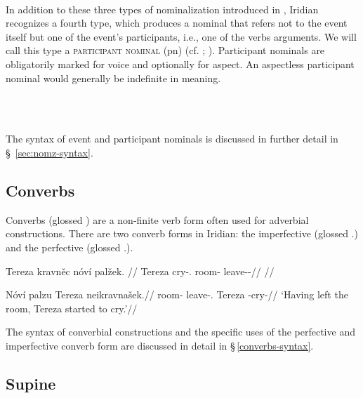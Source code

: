 \pex    {}\\
\xe

In addition to these three types of nominalization introduced in
\textcite{grimshaw1990}, Iridian recognizes a fourth type, which produces a
nominal that refers not to the event itself but one of the event's participants,
i.e., one of the verbs arguments. We will call this type a {\scshape participant
nominal} ({\sc pn}) (cf. \cite[400-5]{schackow2015}; \cite[297-8]{okuna}).
Participant nominals are obligatorily marked for voice and optionally for
aspect. An aspectless participant nominal would generally be indefinite in
meaning.

\pex	{}\\
		\\
\xe

The syntax of event and participant nominals is discussed in further detail in
\S~\ref{sec:nomz-syntax}.

\subsection{Converbs}\label{sec:converb}

Converbs (glossed \Cv{}) are a non-finite verb form often used for adverbial
constructions. There are two converb forms in Iridian: the imperfective
 (glossed \Cv{}.\Ipf{}) and the perfective
 (glossed \Cv{}.\Pf{}).

\pex
\begingl
\gla Tereza kravněc nóví palžek. //
\glb Tereza cry-\Cv{}.\Ipf{} room-\Gen{} leave-\Av{}-\Pf{}//
\glft {}//
\endgl
\xe

\pex
\begingl
\gla Nóví palzu Tereza neikravnašek.//
\glb room-\Gen{} leave-\Cv{}.\Pf{} Tereza -cry-//
\glft `Having left the room, Tereza started to cry.'//
\endgl
\xe

The syntax of converbial constructions and the specific uses of the perfective
and imperfective converb form are discussed in detail in
\S\,\ref{converbs-syntax}.


\subsection{Supine}

